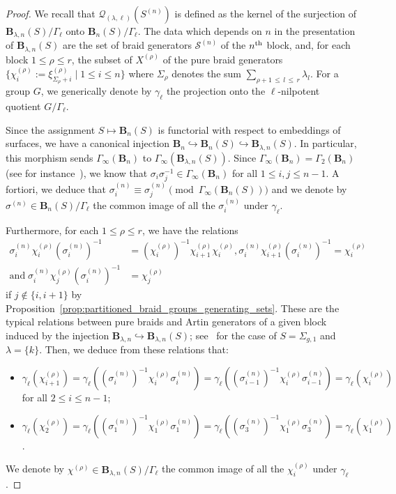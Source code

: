 \documentclass[AHL,Unicode,published]{cedram}
\newcommand{\B}{\ensuremath{\mathbf{B}}}
\newcommand{\LCS}{\varGamma}
\newcommand{\sS}{\mathscr{S}}
\newcommand{\cQ}{\mathcal{Q}}
\renewcommand{\leq}{\leqslant}
\begin{document}
\begin{proof}
We recall that $\cQ_{(\lambda,\ell)}(S^{(n)})$ is defined as the kernel of the surjection of $\B_{\lambda,n}(S)/\LCS_{\ell}$ onto $\B_{n}(S)/\LCS_{\ell}$. The data which depends on $n$ in the presentation of $\B_{\lambda,n}(S)$ are the set of braid generators $\sS^{(n)}$ of the $n^{\rm th}$ block, and, for each block $1\leq \rho\leq r$, the subset of $X^{(\rho)}$ of the pure braid generators $\{ \chi_{i}^{(\rho)}:=\xi^{(\rho)}_{\varSigma_{\rho}+i}\mid 1\leq i\leq n\}$ where $\varSigma_{\rho}$ denotes the sum $\sum_{\rho+1\,\leq\,l\,\leq\,r}\lambda_{l}$. For a group $G$, we generically denote by $\gamma_{\ell}$ the projection onto the $\ell$-nilpotent quotient $G/\LCS_{\ell}$.

Since the assignment $S \mapsto \B_{n}(S)$ is functorial with respect to embeddings of surfaces, we have a canonical injection $\B_{n}\hookrightarrow\B_{n}(S)\hookrightarrow \B_{\lambda,n}(S)$. In particular, this morphism sends $\LCS_\infty(\B_{n})$ to $\LCS_\infty(\B_{\lambda,n}(S))$. Since $\LCS_{\infty}(\B_{n}) = \LCS_{2}(\B_{n})$ (see for instance~\cite[Ex.~2.3]{DPS}), we know that $\sigma_{i} \sigma_{j}^{-1} \in \LCS_\infty(\B_{n})$ for all $1\leq i,j \leq n-1$. A fortiori, we deduce that $\sigma^{(n)}_i \equiv \sigma^{(n)}_j \pmod{\LCS_\infty(\B_{n}(S))}$ and we denote by $\sigma^{(n)} \in \B_{n}(S)/\LCS_{\ell}$ the common image of all the $\sigma^{(n)}_i$ under $\gamma_{\ell}$.

Furthermore, for each $1\leq \rho\leq r$, we have the relations
\begin{align*}
\sigma^{(n)}_{i}\chi^{(\rho)}_{i}\left(\sigma^{(n)}_{i}\right)^{-1}&=\left(\chi^{(\rho)}_{i}\right)^{-1}\chi^{(\rho)}_{i+1}\chi^{(\rho)}_{i}, \sigma^{(n)}_{i}\chi^{(\rho)}_{i+1}\left(\sigma^{(n)}_{i}\right)^{-1}=\chi^{(\rho)}_{i}\\
\text{and}\;\sigma^{(n)}_{i}\chi^{(\rho)}_{j}\left(\sigma^{(n)}_{i}\right)^{-1} &=\chi^{(\rho)}_{j}
\end{align*}
if $j\notin \{i,i+1\}$ by Proposition~\ref{prop:partitioned_braid_groups_generating_sets}. These are the typical relations between pure braids and Artin generators of a given block induced by the injection $\B_{\lambda,n}\hookrightarrow\B_{\lambda,n}(S)$; see~\cite[Prop.~3.2]{BellingeriGodelleGuaschi} for the case of $S=\Sigma_{g,1}$ and $\lambda = \boldsymbol{\{} k \boldsymbol{\}}$. Then, we deduce from these relations that:
\begin{itemize}
\item $\gamma_{\ell}(\chi^{(\rho)}_{i+1}) = \gamma_{\ell}((\sigma^{(n)}_{i})^{-1}\chi^{(\rho)}_{i}\sigma^{(n)}_{i}) = \gamma_{\ell}((\sigma^{(n)}_{i-1})^{-1}\chi^{(\rho)}_{i}\sigma^{(n)}_{i-1}) = \gamma_{\ell}(\chi^{(\rho)}_{i})$ for all $2\leq i\leq n-1$;
\item $\gamma_{\ell}(\chi^{(\rho)}_{2}) = \gamma_{\ell}((\sigma^{(n)}_{1})^{-1}\chi^{(\rho)}_{1}\sigma^{(n)}_{1}) = \gamma_{\ell}((\sigma^{(n)}_{3})^{-1}\chi^{(\rho)}_{1}\sigma^{(n)}_{3}) = \gamma_{\ell}(\chi^{(\rho)}_{1})$.
\end{itemize}
We denote by $\chi^{(\rho)} \in \B_{\lambda,n}(S)/\LCS_{\ell}$ the common image of all the $\chi^{(\rho)}_i$ under $\gamma_{\ell}$.


\end{proof}
\end{document}
